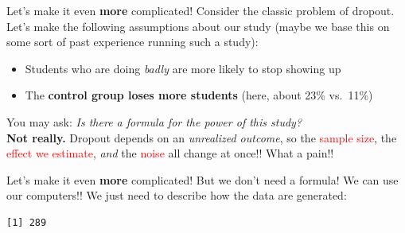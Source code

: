 \documentclass[
  ignorenonframetext,
  aspectratio=169,
]{beamer}
\newenvironment{Shaded}{\begin{snugshade}}{\end{snugshade}}
\newcommand{\AttributeTok}[1]{\textcolor[rgb]{0.40,0.45,0.13}{#1}}
\newcommand{\CommentTok}[1]{\textcolor[rgb]{0.37,0.37,0.37}{#1}}
\newcommand{\ControlFlowTok}[1]{\textcolor[rgb]{0.00,0.23,0.31}{#1}}
\newcommand{\DecValTok}[1]{\textcolor[rgb]{0.68,0.00,0.00}{#1}}
\newcommand{\FloatTok}[1]{\textcolor[rgb]{0.68,0.00,0.00}{#1}}
\newcommand{\FunctionTok}[1]{\textcolor[rgb]{0.28,0.35,0.67}{#1}}
\newcommand{\NormalTok}[1]{\textcolor[rgb]{0.00,0.23,0.31}{#1}}
\newcommand{\OtherTok}[1]{\textcolor[rgb]{0.00,0.23,0.31}{#1}}
\newcommand{\SpecialCharTok}[1]{\textcolor[rgb]{0.37,0.37,0.37}{#1}}
\providecommand{\tightlist}{%
  \setlength{\itemsep}{0pt}\setlength{\parskip}{0pt}}\usepackage{longtable,booktabs,array}
\begin{document}
\begin{frame}{Let's make it even \textbf{more} complicated!}
\label{lets-make-it-even-more-complicated}
Consider the classic problem of dropout. Let's make the following
assumptions about our study (maybe we base this on some sort of past
experience running such a study):

\begin{itemize}
\tightlist
\item
  Students who are doing \emph{badly} are more likely to stop showing up
\item
  The \textbf{control group loses more students} (here, about 23\%
  vs.~11\%)
\end{itemize}

\vskip20pt

\begin{center}
You may ask: \textit{Is there a formula for the power of this study?} \\
\vskip5pt
\textbf{Not really.} Dropout depends on an \textit{unrealized outcome}, so the \textcolor{red}{sample size}, the \textcolor{red}{effect we estimate}, \textit{and} the \textcolor{red}{noise} all change at once!! What a pain!!
\end{center}
\end{frame}

\begin{frame}[fragile]{Let's make it even \textbf{more} complicated!}
\label{lets-make-it-even-more-complicated-1}
But we don't need a formula! We can use our computers!! We just need to
describe how the data are generated:

\begin{Shaded}
\end{Shaded}

\begin{verbatim}
[1] 289
\end{verbatim}
\end{frame}
\end{document}
